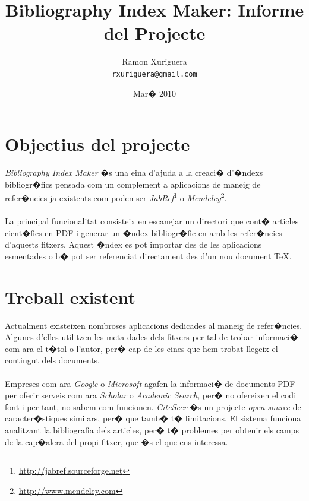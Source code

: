 \documentclass[a4paper,oneside]{article}
\title{\BibTeX{} Bibliography Index Maker: Informe del Projecte}
\author{Ramon Xuriguera\\ \texttt{rxuriguera@gmail.com}}
\date{Mar� 2010}
\begin{document}
\maketitle

\section{Objectius del projecte}
\textit{\BibTeX{} Bibliography Index Maker} �s una eina d'ajuda a la creaci� d'�ndexs bibliogr�fics pensada com un complement a aplicacions de maneig de refer�ncies ja existents com poden ser \textit{\href{http://jabref.sourceforge.net/}{JabRef}}\footnote{\href{http://jabref.sourceforge.net/}{http://jabref.sourceforge.net}} o \textit{\href{http://www.mendeley.com/}{Mendeley}}\footnote{\href{http://www.mendeley.com/}{http://www.mendeley.com}}.

\paragraph{}
La principal funcionalitat consisteix en escanejar un directori que cont� articles cient�fics en PDF i generar un �ndex bibliogr�fic en \BibTeX{} amb les refer�ncies d'aquests fitxers. Aquest �ndex es pot importar des de les aplicacions esmentades o b� pot ser referenciat directament des d'un nou document \TeX.

\section{Treball existent}
Actualment existeixen nombroses aplicacions dedicades al maneig de refer�ncies. Algunes d'elles utilitzen les meta-dades dels fitxers per tal de trobar informaci� com ara el t�tol o l'autor, per� cap de les eines que hem trobat llegeix el contingut dels documents.

\paragraph{}
Empreses com ara \textit{Google} o \textit{Microsoft} agafen la informaci� de documents PDF per oferir serveis com ara \textit{Scholar} o \textit{Academic Search}, per� no ofereixen el codi font i per tant, no sabem com funcionen. \textit{CiteSeer} �s un projecte \textit{open source} de caracter�stiques similars, per� que tamb� t� limitacions. El sistema funciona analitzant la bibliografia dels articles, per� t� problemes per obtenir els camps de la cap�alera del propi fitxer, que �s el que ens interessa.
\end{document}
